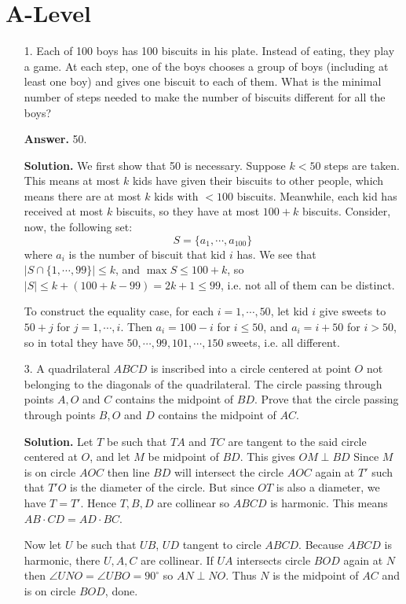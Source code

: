 \documentclass[11pt,a4paper]{article}
\begin{document}
\section*{A-Level}
\begin{enumerate}
	\item [1.]
	Each of 100 boys has 100 biscuits in his plate. Instead of eating, they play a
	game. At each step, one of the boys chooses a group of boys (including at least
	one boy) and gives one biscuit to each of them. What is the minimal number of
	steps needed to make the number of biscuits different for all the boys?
	
	\textbf{Answer.} 50. 
	
	\textbf{Solution.} 
	We first show that 50 is necessary. 
	Suppose $k<50$ steps are taken. 
	This means at most $k$ kids have given their biscuits to other people, which means there are at most $k$ kids with $<100$ biscuits. 
	Meanwhile, each kid has received at most $k$ biscuits, so they have at most $100+k$ biscuits. 
	Consider, now, the following set: 
	\[
	S=\{a_1, \cdots, a_{100}\}
	\]
	where $a_i$ is the number of biscuit that kid $i$ has. 
	We see that $|S\cap \{1, \cdots, 99\}|\le k$, and $\max S\le 100+k$, 
	so $|S|\le k+(100+k-99)=2k+1\le 99$, i.e. not all of them can be distinct. 
	
	To construct the equality case, for each $i=1, \cdots, 50$, let kid $i$ give sweets to $50+j$ for $j=1, \cdots, i$. 
	Then $a_i=100-i$ for $i\le 50$, and $a_i=i+50$ for $i>50$, 
	so in total they have $50, \cdots, 99, 101, \cdots, 150$ sweets, i.e. all different. 
	
	\item [3.]
	A quadrilateral $ABCD$ is inscribed into a circle centered at point $O$ not belonging
	to the diagonals of the quadrilateral. The circle passing through points $A, O$ and
	$C$ contains the midpoint of $BD$. Prove that the circle passing through points $B,
	O$ and $D$ contains the midpoint of $AC$.
	
	\textbf{Solution.}
	Let $T$ be such that $TA$ and $TC$ are tangent to the said circle centered at $O$, 
	and let $M$ be midpoint of $BD$. 
	This gives $OM\perp BD$
	Since $M$ is on circle $AOC$ then line $BD$ will intersect the circle $AOC$ again at $T'$ such that $T'O$ is the diameter of the circle. 
	But since $OT$ is also a diameter, we have $T=T'$. 
	Hence $T, B, D$ are collinear so $ABCD$ is harmonic. 
	This means $AB\cdot CD= AD\cdot BC$. 
	
	Now let $U$ be such that $UB$, $UD$ tangent to circle $ABCD$. 
	Because $ABCD$ is harmonic, 
	there $U, A, C$ are collinear. 
	If $UA$ intersects circle $BOD$ again at $N$ then $\angle UNO=\angle UBO=90^{\circ}$ so 
	$AN\perp NO$. 
	Thus $N$ is the midpoint of $AC$ and is on circle $BOD$, done. 
	

\end{enumerate}
\end{document}
